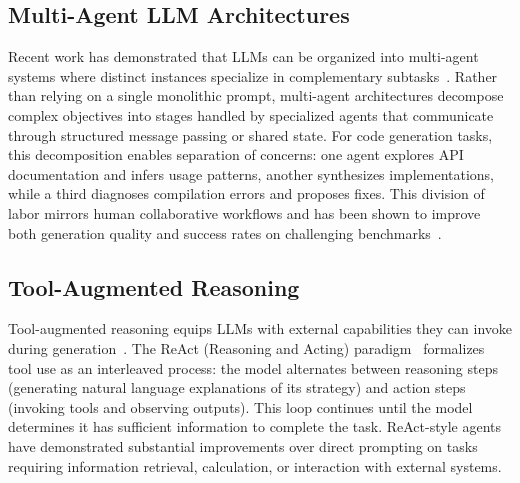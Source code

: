 \subsection{Multi-Agent LLM Architectures}
\label{sec:prelim:llm}

Recent work has demonstrated that LLMs can be organized into multi-agent systems where distinct instances specialize in complementary subtasks~\cite{CITE:MultiAgentCode}. Rather than relying on a single monolithic prompt, multi-agent architectures decompose complex objectives into stages handled by specialized agents that communicate through structured message passing or shared state. For code generation tasks, this decomposition enables separation of concerns: one agent explores API documentation and infers usage patterns, another synthesizes implementations, while a third diagnoses compilation errors and proposes fixes. This division of labor mirrors human collaborative workflows and has been shown to improve both generation quality and success rates on challenging benchmarks~\cite{CITE:AgentBench}.

\subsection{Tool-Augmented Reasoning}
\label{sec:prelim:tools}

Tool-augmented reasoning equips LLMs with external capabilities they can invoke during generation~\cite{DBLP:conf/nips/SchickDSHWSCSW23:Toolformer,CITE:ToolLLM}. The ReAct (Reasoning and Acting) paradigm~\cite{DBLP:conf/iclr/YaoZYDSN023:ReAct} formalizes tool use as an interleaved process: the model alternates between reasoning steps (generating natural language explanations of its strategy) and action steps (invoking tools and observing outputs). This loop continues until the model determines it has sufficient information to complete the task. ReAct-style agents have demonstrated substantial improvements over direct prompting on tasks requiring information retrieval, calculation, or interaction with external systems.
